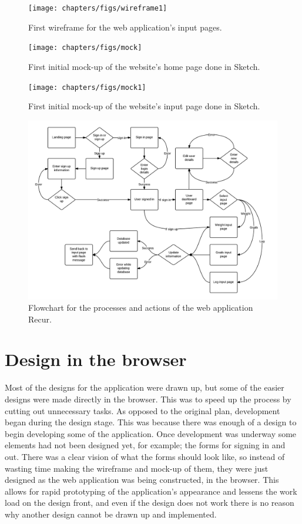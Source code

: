 \begin{figure}[!ht]
\centering
\texttt{[image: chapters/figs/wireframe1]}
\caption{First wireframe for the web application's input pages.}
\label{fig:erd}
\end{figure}

\begin{figure}[!ht]
\centering
\texttt{[image: chapters/figs/mock]}
\caption{First initial mock-up of the website's home page done in Sketch.}
\label{fig:erd}
\end{figure}

\begin{figure}[!ht]
\centering
\texttt{[image: chapters/figs/mock1]}
\caption{First initial mock-up of the website's input page done in Sketch.}
\label{fig:erd}
\end{figure}

\begin{figure}[!ht]
\centering
\includegraphics[scale=0.3]{chapters/figs/flowchart}
\caption{Flowchart for the processes and actions of the web application Recur.}
\label{fig:flowchart}
\end{figure}

\section{Design in the browser}
Most of the designs for the application were drawn up, but some of the easier designs were made directly in the browser. This was to speed up the process by cutting out unnecessary tasks. As opposed to the original plan, development began during the design stage. This was because there was enough of a design to begin developing some of the application. Once development was underway some elements had not been designed yet, for example; the forms for signing in and out. There was a clear vision of what the forms should look like, so instead of wasting time making the wireframe and mock-up of them, they were just designed as the web application was being constructed, in the browser. This allows for rapid prototyping of the application's appearance and lessens the work load on the design front, and even if the design does not work there is no reason why another design cannot be drawn up and implemented.\\

